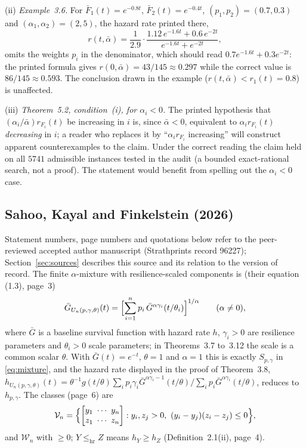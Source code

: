 \documentclass[10pt]{article}
\theoremstyle{plain}
\theoremstyle{definition}
\theoremstyle{remark}
\newcommand{\hr}{\mathrm{hr}}
\newcommand{\bmat}[2]{\begin{bmatrix} #1 \\ #2 \end{bmatrix}}
\begin{document}
(ii) \emph{Example~3.6.} For $\bar F_1(t)=e^{-0.8t}$, $\bar F_2(t)=e^{-0.4t}$, $(p_1,p_2)=(0.7,0.3)$ and $(\alpha_1,\alpha_2)=(2,5)$, the hazard rate printed there,
\[
r(t,\bar\alpha)=\frac1{2.9}\cdot\frac{1.12\,e^{-1.6t}+0.6\,e^{-2t}}{e^{-1.6t}+e^{-2t}},
\]
omits the weights $p_i$ in the denominator, which should read $0.7e^{-1.6t}+0.3e^{-2t}$: the printed formula gives $r(0,\bar\alpha)=43/145\approx0.297$ while the correct value is $86/145\approx0.593$. The conclusion drawn in the example ($r(t,\bar\alpha)<r_1(t)=0.8$) is unaffected.

(iii) \emph{Theorem~5.2, condition~(i), for $\alpha_i<0$.} The printed hypothesis that $(\alpha_i/\bar\alpha)r_{F_i}(t)$ be increasing in $i$ is, since $\bar\alpha<0$, equivalent to $\alpha_ir_{F_i}(t)$ \emph{decreasing} in $i$; a reader who replaces it by ``$\alpha_ir_{F_i}$ increasing'' will construct apparent counterexamples to the claim. Under the correct reading the claim held on all $5741$ admissible instances tested in the audit (a bounded exact-rational search, not a proof). The statement would benefit from spelling out the $\alpha_i<0$ case.

\subsection{Sahoo, Kayal and Finkelstein (2026)}\label{sec:SKF}

Statement numbers, page numbers and quotations below refer to the peer-reviewed accepted author manuscript (Strathprints record 96227); Section~\ref{sec:sources} describes this source and its relation to the version of record. The finite $\alpha$-mixture with resilience-scaled components is (their equation (1.3), page~3)
\[
\bar G_{U_n(p,\gamma,\theta)}(t)=\Bigl[\sum_{i=1}^n p_i\,\bar G^{\alpha\gamma_i}(t/\theta_i)\Bigr]^{1/\alpha}\qquad(\alpha\ne 0),
\]
where $\bar G$ is a baseline survival function with hazard rate $h$, $\gamma_i>0$ are resilience parameters and $\theta_i>0$ scale parameters; in Theorems~3.7 to~3.12 the scale is a common scalar $\theta$. With $\bar G(t)=e^{-t}$, $\theta=1$ and $\alpha=1$ this is exactly $S_{p,\gamma}$ in \eqref{eq:mixture}, and the hazard rate displayed in the proof of Theorem~3.8, $h_{U_n(p,\gamma,\theta)}(t)=\theta^{-1}g(t/\theta)\sum_ip_i\gamma_i\bar G^{\alpha\gamma_i-1}(t/\theta)/\sum_ip_i\bar G^{\alpha\gamma_i}(t/\theta)$, reduces to $h_{p,\gamma}$. The classes (page~6) are
\[
\mathcal V_n=\Bigl\{\bmat{y_1\ \cdots\ y_n}{z_1\ \cdots\ z_n}: y_i,z_j>0,\ (y_i-y_j)(z_i-z_j)\le 0\Bigr\},
\]
and $\mathcal W_n$ with $\ge 0$; $Y\le_{\hr}Z$ means $h_Y\ge h_Z$ (Definition~2.1(ii), page~4).
\end{document}

